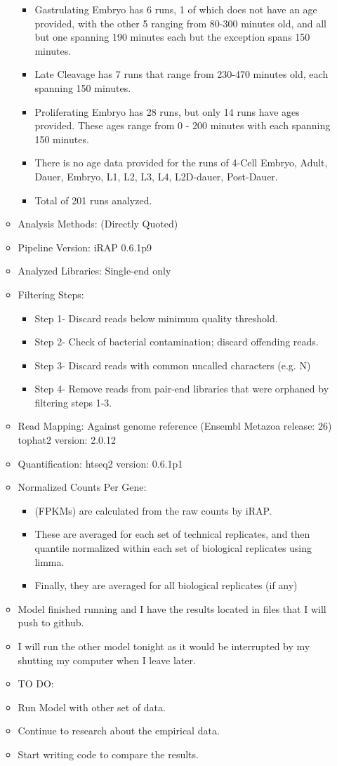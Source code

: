 \documentclass[letterpaper,index=totoc,hyperref,openany]{labbook} %
\begin{document}
\begin{itemize}
\begin{itemize}
\begin{itemize}
\item Gastrulating Embryo has 6 runs, 1 of which does not have an age provided, with the other 5 ranging from 80-300 minutes old, and all but one spanning 190 minutes each but the exception spans 150 minutes.
\item Late Cleavage has 7 runs that range from 230-470 minutes old, each spanning 150 minutes.
\item Proliferating Embryo has 28 runs, but only 14 runs have ages provided. These ages range from 0 - 200 minutes with each spanning 150 minutes.
\item There is no age data provided for the runs of 4-Cell Embryo, Adult, Dauer, Embryo, L1, L2, L3, L4, L2D-dauer, Post-Dauer.
\item Total of 201 runs analyzed.
\end{itemize}
\item Analysis Methods: (Directly Quoted)
\item Pipeline Version: iRAP 0.6.1p9
\item Analyzed Libraries: Single-end only
\item Filtering Steps: 
\begin{itemize}
\item Step 1- Discard reads below minimum quality threshold.
\item Step 2- Check of bacterial contamination; discard offending reads.
\item Step 3- Discard reads with common uncalled characters (e.g. N)
\item Step 4- Remove reads from pair-end libraries that were orphaned by filtering steps 1-3.
\end{itemize}
\item Read Mapping: Against genome reference (Ensembl Metazoa release: 26) tophat2 version: 2.0.12
\item Quantification: htseq2 version: 0.6.1p1
\item Normalized Counts Per Gene: 
\begin{itemize}
\item (FPKMs) are calculated from the raw counts by iRAP. 
\item These are averaged for each set of technical replicates, and then quantile normalized within each set of biological replicates using limma. 
\item Finally, they are averaged for all biological replicates (if any)
\end{itemize}
\item Model finished running and I have the results located in files that I will push to github.
\item I will run the other model tonight as it would be interrupted by my shutting my computer when I leave later.
\item TO DO:
\item Run Model with other set of data.
\item Continue to research about the empirical data.
\item Start writing code to compare the results.
\end{itemize}
\end{itemize}
\end{document}

